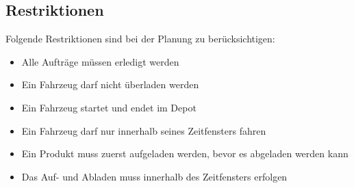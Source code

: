 \subsection{Restriktionen}
\label{sec:Restriktionen}
Folgende Restriktionen sind bei der Planung zu berücksichtigen:
\begin{itemize}
 \item Alle Aufträge müssen erledigt werden
 \item Ein Fahrzeug darf nicht überladen werden
 \item Ein Fahrzeug startet und endet im Depot 
 \item Ein Fahrzeug darf nur innerhalb seines Zeitfensters fahren
 \item Ein Produkt muss zuerst aufgeladen werden, bevor es abgeladen werden kann
 \item Das Auf- und Abladen muss innerhalb des Zeitfensters erfolgen
\end{itemize}
